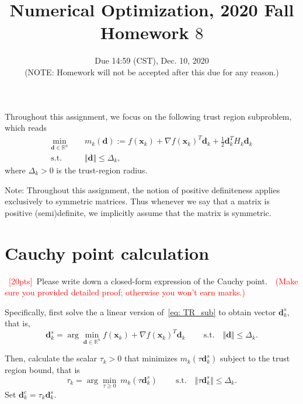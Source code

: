 \documentclass[10pt]{article}
\begin{document}
	
\title{	Numerical Optimization, 2020 Fall\\Homework $8$}
\date{Due 14:59 (CST), Dec. 10, 2020 \\(NOTE: Homework will not be accepted after this due for any reason.)\\}
\maketitle
Throughout this assignment, we focus on the following trust region subproblem, which reads
\begin{equation}\label{eq: TR_sub}
	\begin{aligned}
		\min_{\bm{d}\in\mathbb{R}^{n}}~&\quad m_{k}(\bm{d}):= f(\bm{x}_{k}) + \nabla f(\bm{x}_{k})^{T}\bm{d}_{k} + \tfrac{1}{2}\bm{d}_{k}^{T}H_{k}\bm{d}_{k}\\
		\textrm{s.t.}~~\ &\quad\Vert\bm{d}\Vert\leq \Delta_{k},
	\end{aligned}
\end{equation}
where $\Delta_{k} > 0$ is the trust-region radius.

Note: Throughout this assignment, the notion of positive definiteness applies exclusively to symmetric matrices. Thus whenever we say that a matrix is positive (semi)definite, we implicitly assume that the matrix is symmetric.
\section{Cauchy point calculation}
~\textcolor{red}{[20pts]}~Please write down a closed-form expression of the Cauchy point.~\textcolor{red}{~(Make sure you provided detailed proof; otherwise you won't earn marks.)}

Specifically, first solve the a linear version of~\eqref{eq: TR_sub} to obtain vector $\bm{d}^{s}_{k}$, that is,
\begin{equation}\label{eq:linear_tr}
	\bm{d}^{s}_{k} = \arg\min_{\bm{d}\in\mathbb{R}^{n}}f(\bm{x}_{k}) + \nabla f(\bm{x}_{k})^{T}\bm{d}_{k}\qquad~\textrm{s.t.}\quad\Vert\bm{d}\Vert\leq \Delta_{k}.
\end{equation}

Then, calculate the scalar $\tau_{k}>0$ that minimizes $m_{k}(\tau\bm{d}^{s}_{k})$ subject to the trust region bound, that is
\begin{equation}\label{eq: scalar_cal}
	\tau_{k} = \arg\min_{\tau\geq0}~m_{k}(\tau\bm{d}^{s}_{k})\qquad~\textrm{s.t.}\quad\Vert\tau\bm{d}^{s}_{k}\Vert\leq \Delta_{k}.
\end{equation}
Set $\bm{d}_{k}^{c} = \tau_{k}\bm{d}^{s}_{k}$.
\end{document}
